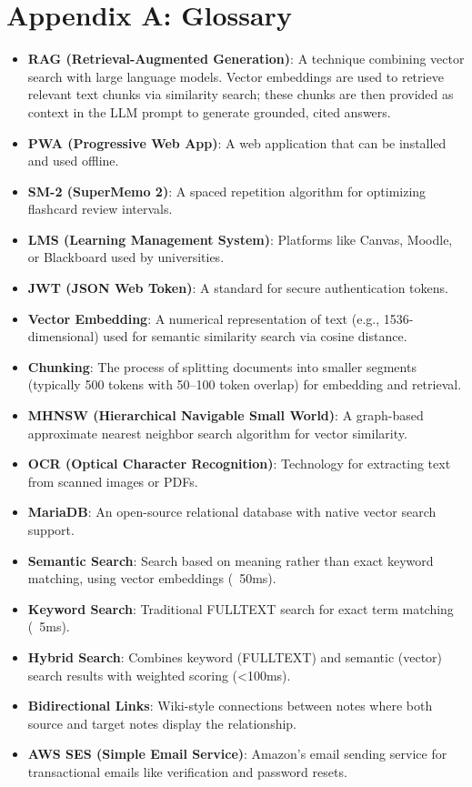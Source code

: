 \documentclass[12pt,a4paper]{article}
\begin{document}
\section*{Appendix A: Glossary}

\begin{itemize}
    \item \textbf{RAG (Retrieval-Augmented Generation)}: A technique combining vector search with large language models. Vector embeddings are used to retrieve relevant text chunks via similarity search; these chunks are then provided as context in the LLM prompt to generate grounded, cited answers.
    \item \textbf{PWA (Progressive Web App)}: A web application that can be installed and used offline.
    \item \textbf{SM-2 (SuperMemo 2)}: A spaced repetition algorithm for optimizing flashcard review intervals.
    \item \textbf{LMS (Learning Management System)}: Platforms like Canvas, Moodle, or Blackboard used by universities.
    \item \textbf{JWT (JSON Web Token)}: A standard for secure authentication tokens.
    \item \textbf{Vector Embedding}: A numerical representation of text (e.g., 1536-dimensional) used for semantic similarity search via cosine distance.
    \item \textbf{Chunking}: The process of splitting documents into smaller segments (typically 500 tokens with 50--100 token overlap) for embedding and retrieval.
    \item \textbf{MHNSW (Hierarchical Navigable Small World)}: A graph-based approximate nearest neighbor search algorithm for vector similarity.
    \item \textbf{OCR (Optical Character Recognition)}: Technology for extracting text from scanned images or PDFs.
    \item \textbf{MariaDB}: An open-source relational database with native vector search support.
    \item \textbf{Semantic Search}: Search based on meaning rather than exact keyword matching, using vector embeddings (~50ms).
    \item \textbf{Keyword Search}: Traditional FULLTEXT search for exact term matching (~5ms).
    \item \textbf{Hybrid Search}: Combines keyword (FULLTEXT) and semantic (vector) search results with weighted scoring (<100ms).
    \item \textbf{Bidirectional Links}: Wiki-style connections between notes where both source and target notes display the relationship.
    \item \textbf{AWS SES (Simple Email Service)}: Amazon's email sending service for transactional emails like verification and password resets.
\end{itemize}
\end{document}
